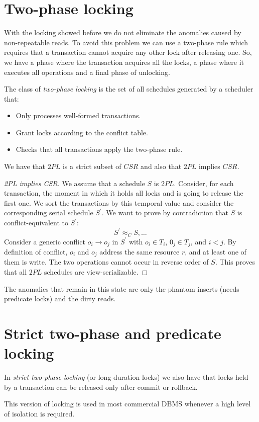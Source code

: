 \documentclass[12pt, a4paper]{report}
\newtheorem[style=M,bodystyle=\normalfont]{theorem}{Theorem}
\newtheorem[style=M,bodystyle=\normalfont]{corollary}{Corollary}
\newtheorem[style=M,bodystyle=\normalfont]{lemma}{Lemma}
\newtheorem[style=M,bodystyle=\normalfont]{definition}{Definition}
\begin{document}
    \section{Two-phase locking}
    With the locking showed before we do not eliminate the anomalies caused by non-repeatable reads. To avoid this problem we can use a two-phase rule which requires that a 
    transaction cannot acquire any other lock after releasing one. So, we have a phase where the transaction acquires all the locks, a phase where it executes all operations and 
    a final phase of unlocking. 
    \begin{definition}
        The class of \emph{two-phase locking} is the set of all schedules generated by a scheduler that: 
        \begin{itemize}
            \item Only processes well-formed transactions. 
            \item Grant locks according to the conflict table. 
            \item Checks that all transactions apply the two-phase rule.             
        \end{itemize}
    \end{definition}
    We have that $2PL$ is a strict subset of $CSR$ and also that $2PL$ implies $CSR$. 
    \begin{proof}[2PL implies CSR]
        We assume that a schedule $S$ is $2PL$. Consider, for each transaction, the moment in which it holds all locks and is going to release the first one. 
        We sort the transactions by this temporal value and consider the corresponding serial schedule $S^{'}$. We want to prove by contradiction that $S$ is conflict-equivalent to 
        $S^{'}$: 
        \[S^{'}\approx_CS,\dots\]
        Consider a generic conflict $o_i \rightarrow o_j$ in $S^{'}$ with $o_i \in T_i$, $0_j \in T_j$, and $i<j$. 
        By definition of conflict, $o_i$ and $o_j$ address the same resource $r$, and at least one of them is write. The two operations cannot occur in reverse order of $S$. 
        This proves that all $2PL$ schedules are view-serializable. 
    \end{proof}
    The anomalies that remain in this state are only the phantom inserts (needs predicate locks) and the dirty reads. 

    \section{Strict two-phase and predicate locking}
    \begin{definition}
        In \emph{strict two-phase locking} (or long duration locks) we also have that locks held by a transaction can be released only after commit or rollback.
    \end{definition}
    This version of locking is used in most commercial DBMS whenever a high level of isolation is required. 
\end{document}
